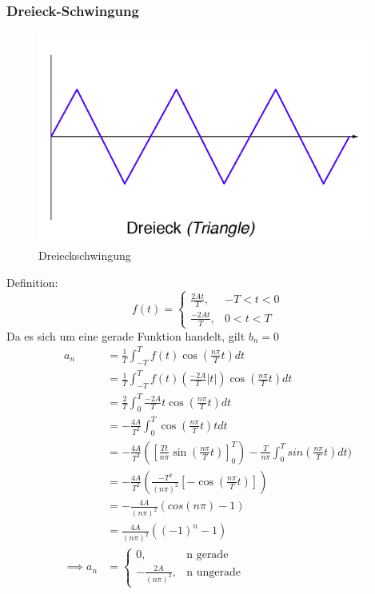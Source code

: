   \subsubsection{Dreieck-Schwingung}
  \begin{figure}[h]
    \centering
    \includegraphics[height=7cm]{Dreieck.png}
    \caption{Dreieckschwingung \cite{Schwingungen}}
    \label{fig:deck}
  \end{figure}
  Definition:
  \begin{equation}
    f(t)= \begin{cases}
          \frac{2At}{T}   , & -T < t < 0 \\
          \frac{-2At}{T} , & 0 < t < T
        \end{cases}
  \end{equation}
  Da es sich um eine gerade Funktion handelt, gilt $ b_n = 0$
  \begin{align*}
    a_n &= \frac{1}{T} \int_{-T}^T f(t) \cos ( \frac{n\pi}{T} t) dt \\
    &= \frac{1}{T} \int_{-T}^T f(t) (\frac{-2A}{T} \lvert t\rvert)
    \cos (\frac{n\pi}{T} t) dt \\
    &= \frac{2}{T} \int_0^T \frac{-2A}{T} t \cos (\frac{n\pi}{T} t) dt \\
    &= -\frac{4A}{T^2} \int_0^T \cos (\frac{n\pi}{T} t) t dt \\
    &= -\frac{4A}{T^2} ([\frac{Tt}{n\pi} \sin(\frac{n\pi}{T}t)]_0^T)
    - \frac{T}{n\pi} \int_0^T sin(\frac{n\pi}{T}t)dt ) \\
    &= -\frac{4A}{T^2} (\frac{-T^2}{(n\pi)^2}[-\cos(\frac{n\pi}{T}t)]) \\
    &= -\frac{4A}{(n\pi)^2} (cos(n\pi)-1) \\
    &= \frac{4A}{(n\pi)^2} ((-1)^n-1) \\
    \implies a_n &= \begin{cases}
          0  , &\text{n gerade} \\
          -\frac{2A}{(n\pi)^2}  , &\text{n ungerade}
        \end{cases}
\end{align*}

